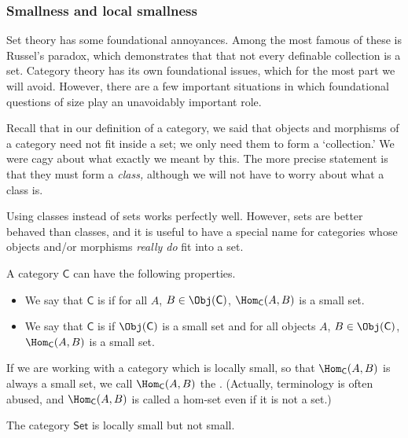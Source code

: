 \documentclass[main.tex]{subfiles}
\begin{document}
\subsubsection{Smallness and local smallness}

Set theory has some foundational annoyances. Among the most famous of these is Russel's paradox, which demonstrates that that not every definable collection is a set. Category theory has its own foundational issues, which for the most part we will avoid. However, there are a few important situations in which foundational questions of size play an unavoidably important role.

Recall that in our definition of a category, we said that objects and morphisms of a category need not fit inside a set; we only need them to form a `collection.' We were cagy about what exactly we meant by this. The more precise statement is that they must form a \emph{class,} although we will not have to worry about what a class is.

Using classes instead of sets works perfectly well. However, sets are better behaved than classes, and it is useful to have a special name for categories whose objects and/or morphisms \emph{really do} fit into a set.

\begin{definition}
  \label{def:smalllocallysmallcategoryhomset}
  A category $\mathsf{C}$ can have the following properties.
  \begin{itemize}
    \item We say that $\mathsf{C}$ is  if for all $A$, $B \in \Obj(\mathsf{C})$, $\Hom_{\mathsf{C}}(A, B)$ is a small set.

    \item We say that $\mathsf{C}$ is  if $\Obj(\mathsf{C})$ is a small set and for all objects $A$, $B \in \Obj(\mathsf{C})$, $\Hom_{\mathsf{C}}(A, B)$ is a small set.
  \end{itemize}
\end{definition}

If we are working with a category which is locally small, so that $\Hom_{\mathsf{C}}(A,B)$ is always a small set, we call $\Hom_{\mathsf{C}}(A, B)$ the . (Actually, terminology is often abused, and $\Hom_{\mathsf{C}}(A, B)$ is called a hom-set even if it is not a set.)

\begin{example}
  The category $\mathsf{Set}$ is locally small but not small.
\end{example}
\end{document}
